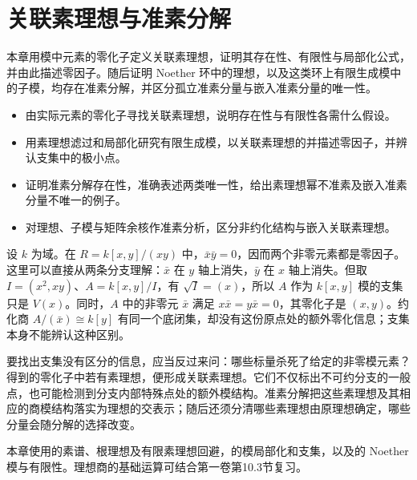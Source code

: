 
\chapter{关联素理想与准素分解}
\label{b3:ch:04}

\begin{chapterabstract}
	本章用模中元素的零化子定义关联素理想，证明其存在性、有限性与局部化公式，并由此描述零因子。随后证明 Noether 环中的理想，以及这类环上有限生成模中的子模，均存在准素分解，并区分孤立准素分量与嵌入准素分量的唯一性。
\end{chapterabstract}

\begin{learninggoals}
	\begin{itemize}
		\item 由实际元素的零化子寻找关联素理想，说明存在性与有限性各需什么假设。
		\item 用素理想滤过和局部化研究有限生成模，以关联素理想的并描述零因子，并辨认支集中的极小点。
		\item 证明准素分解存在性，准确表述两类唯一性，给出素理想幂不准素及嵌入准素分量不唯一的例子。
		\item 对理想、子模与矩阵余核作准素分析，区分非约化结构与嵌入关联素理想。
	\end{itemize}
\end{learninggoals}

设 \(k\) 为域。在 \(R=k[x,y]/(xy)\) 中，\(\bar x\bar y=0\)，因而两个非零元素都是零因子。这里可以直接从两条分支理解：\(\bar x\) 在 \(y\) 轴上消失，\(\bar y\) 在 \(x\) 轴上消失。但取 \(I=(x^2,xy)\)、\(A=k[x,y]/I\)，有 \(\sqrt I=(x)\)，所以 \(A\) 作为 \(k[x,y]\) 模的支集只是 \(V(x)\)。同时，\(A\) 中的非零元 \(\bar x\) 满足 \(x\bar x=y\bar x=0\)，其零化子是 \((x,y)\)。约化商 \(A/(\bar x)\cong k[y]\) 有同一个底闭集，却没有这份原点处的额外零化信息；支集本身不能辨认这种区别。

\ProseParagraphBreak

要找出支集没有区分的信息，应当反过来问：哪些标量杀死了给定的非零模元素？得到的零化子中若有素理想，便形成关联素理想。它们不仅标出不可约分支的一般点，也可能检测到分支内部特殊点处的额外模结构。准素分解把这些素理想及其相应的商模结构落实为理想的交表示；随后还须分清哪些素理想由原理想确定，哪些分量会随分解的选择改变。

\ProseParagraphBreak

本章使用的素谱、根理想及有限素理想回避，的模局部化和支集，以及的 Noether 模与有限性。理想商的基础运算可结合第一卷第10.3节复习。

